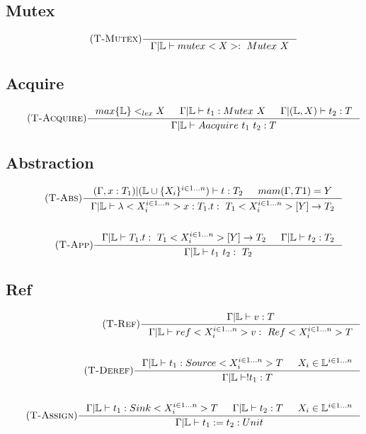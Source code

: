 \documentclass[12pt]{article}
\def\lock {\mathbb{L}}
\begin{document}
\subsection{Mutex}
\begin{align*}
    \tag {\textsc{T-Mutex}}
    \inference[]{
        }{\Gamma|\lock \vdash mutex<X> :~Mutex~X}
\end{align*}

\subsection{Acquire}
\begin{align*}
\tag{\textsc{T-Acquire}}
\inference[]{max\{\lock\}<_{lex}X & \Gamma|\lock \vdash t_1:Mutex~X 
& \Gamma|(\lock,X) \vdash t_2:T}{\Gamma|\lock \vdash Aacquire~t_1~t_2:T}
\end{align*}

\subsection{Abstraction}
\begin{align*}
\tag {\textsc{T-Abs}}
\inference[]{
    (\Gamma,x:T_1)|(\lock\cup\{X_i\}^{i\in 1...n}) \vdash t:T_2 & mam(\Gamma,T1) = Y
    }{\Gamma|\lock \vdash \lambda<X_i^{i\in 1...n}> x:T_1.t :~T_1<X_i^{i\in 1...n}>[Y]\rightarrow T_2}
    \\
    \\
    \tag {\textsc{T-App}}
\inference[]{
    \Gamma|\lock \vdash T_1.t :~T_1<X_i^{i\in 1...n}>[Y]\rightarrow T_2 & \Gamma|\lock \vdash t_2:T_2 
    }{\Gamma|\lock \vdash t_1\ t_2:~T_2}
\end{align*}

\subsection{Ref}
\begin{align*}
    \tag {\textsc{T-Ref}}
    \inference[]{\Gamma|\lock \vdash v:T}{\Gamma|\lock \vdash ref<X_i^{i\in 1...n}> v:~Ref<X_i^{i\in 1...n}>T}
    \\
    \\
    \tag {\textsc{T-Deref}}
    \inference[]{\Gamma|\lock \vdash t_1:Source<X_i^{i\in 1...n}>T & X_i\in \lock^{i\in 1...n}}{\Gamma|\lock\vdash !t_1:T}
    \\
    \\
    \tag {\textsc{T-Assign}}
    \inference[]{\Gamma|\lock \vdash t_1:Sink<X_i^{i\in 1...n}>T & \Gamma|\lock \vdash t_2:T & X_i\in \lock^{i\in 1...n}}{\Gamma|\lock\vdash t_1 := t_2:Unit}
\end{align*}
\end{document}
